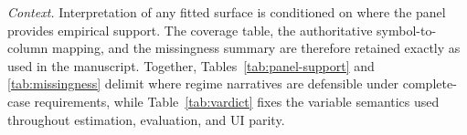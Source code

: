 \documentclass[11pt]{article}
\newcommand{\TableStyle}{%
    \small
    \setlength{\tabcolsep}{2pt}%
    \renewcommand{\arraystretch}{0.9}%
}
\begin{document}
\noindent\justifying
\textit{Context.} Interpretation of any fitted surface is conditioned on where the panel provides empirical support.
The coverage table, the authoritative symbol-to-column mapping, and the missingness summary are therefore retained
exactly as used in the manuscript. Together, Tables~\ref{tab:panel-support} and \ref{tab:missingness} delimit where
regime narratives are defensible under complete-case requirements, while Table~\ref{tab:vardict} fixes the variable
semantics used throughout estimation, evaluation, and UI parity.
\begin{table}[!t]
\centering
\TableStyle
\caption{\textbf{Data scope:} canonical panel support after collapsing scenario replication. For country $i$, $n_i = |\{t : \exists s\; (i,t,s)\in\mathcal{D}_{\mathrm{canonical}}\}|$. \textbf{Method context:} these counts define the effective support envelope used to read both in-sample diagnostics and refit OOS protocol summaries. \textbf{Interpretation boundary:} total unique country--year support is 207 across 83 countries, and the table does not by itself provide effect-size, causal, or policy-intervention evidence.}
\label{tab:panel-support}


\end{table}
\end{document}
